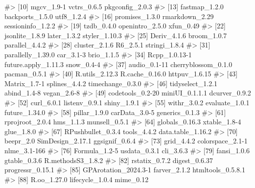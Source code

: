 \documentclass[
  letterpaper,
  DIV=11,
  numbers=noendperiod]{scrreprt}
\newenvironment{Shaded}{\begin{snugshade}}{\end{snugshade}}
\newcommand{\CommentTok}[1]{\textcolor[rgb]{0.37,0.37,0.37}{#1}}
\theoremstyle{definition}
\theoremstyle{remark}
\begin{document}
\begin{Shaded}
\begin{Highlighting}[]
\CommentTok{\#\textgreater{} [10] mgcv\_1.9{-}1           vctrs\_0.6.5          pkgconfig\_2.0.3     }
\CommentTok{\#\textgreater{} [13] fastmap\_1.2.0        backports\_1.5.0      utf8\_1.2.4          }
\CommentTok{\#\textgreater{} [16] promises\_1.3.0       rmarkdown\_2.29       sessioninfo\_1.2.2   }
\CommentTok{\#\textgreater{} [19] tzdb\_0.4.0           openintro\_2.5.0      xfun\_0.49           }
\CommentTok{\#\textgreater{} [22] jsonlite\_1.8.9       later\_1.3.2          styler\_1.10.3       }
\CommentTok{\#\textgreater{} [25] Deriv\_4.1.6          broom\_1.0.7          parallel\_4.4.2      }
\CommentTok{\#\textgreater{} [28] cluster\_2.1.6        R6\_2.5.1             stringi\_1.8.4       }
\CommentTok{\#\textgreater{} [31] parallelly\_1.39.0    car\_3.1{-}3            brio\_1.1.5          }
\CommentTok{\#\textgreater{} [34] Rcpp\_1.0.13{-}1        future.apply\_1.11.3  snow\_0.4{-}4          }
\CommentTok{\#\textgreater{} [37] audio\_0.1{-}11         cherryblossom\_0.1.0  pacman\_0.5.1        }
\CommentTok{\#\textgreater{} [40] R.utils\_2.12.3       R.cache\_0.16.0       httpuv\_1.6.15       }
\CommentTok{\#\textgreater{} [43] Matrix\_1.7{-}1         splines\_4.4.2        timechange\_0.3.0    }
\CommentTok{\#\textgreater{} [46] tidyselect\_1.2.1     abind\_1.4{-}8          vegan\_2.6{-}8         }
\CommentTok{\#\textgreater{} [49] codetools\_0.2{-}20     miniUI\_0.1.1.1       dcurver\_0.9.2       }
\CommentTok{\#\textgreater{} [52] curl\_6.0.1           listenv\_0.9.1        shiny\_1.9.1         }
\CommentTok{\#\textgreater{} [55] withr\_3.0.2          evaluate\_1.0.1       future\_1.34.0       }
\CommentTok{\#\textgreater{} [58] pillar\_1.9.0         carData\_3.0{-}5        generics\_0.1.3      }
\CommentTok{\#\textgreater{} [61] rprojroot\_2.0.4      hms\_1.1.3            munsell\_0.5.1       }
\CommentTok{\#\textgreater{} [64] globals\_0.16.3       xtable\_1.8{-}4         glue\_1.8.0          }
\CommentTok{\#\textgreater{} [67] RPushbullet\_0.3.4    tools\_4.4.2          data.table\_1.16.2   }
\CommentTok{\#\textgreater{} [70] beepr\_2.0            SimDesign\_2.17.1     ggsignif\_0.6.4      }
\CommentTok{\#\textgreater{} [73] grid\_4.4.2           colorspace\_2.1{-}1     nlme\_3.1{-}166        }
\CommentTok{\#\textgreater{} [76] Formula\_1.2{-}5        usdata\_0.3.1         cli\_3.6.3           }
\CommentTok{\#\textgreater{} [79] fansi\_1.0.6          gtable\_0.3.6         R.methodsS3\_1.8.2   }
\CommentTok{\#\textgreater{} [82] rstatix\_0.7.2        digest\_0.6.37        progressr\_0.15.1    }
\CommentTok{\#\textgreater{} [85] GPArotation\_2024.3{-}1 farver\_2.1.2         htmltools\_0.5.8.1   }
\CommentTok{\#\textgreater{} [88] R.oo\_1.27.0          lifecycle\_1.0.4      mime\_0.12}
\end{Highlighting}
\end{Shaded}
\end{document}
